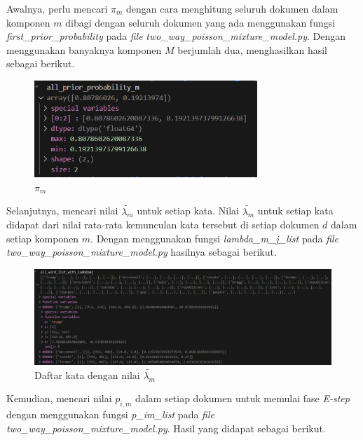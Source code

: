 Awalnya, perlu mencari $\pi_{m}$ dengan cara menghitung seluruh dokumen dalam komponen $m$
dibagi dengan seluruh dokumen yang ada menggunakan fungsi 
\textit{first\_prior\_probability} pada \textit{file} \textit{two\_way\_poisson\_mixture\_model.py}. 
Dengan menggunakan banyaknya komponen $M$ berjumlah dua, menghasilkan hasil sebagai berikut.

\begin{figure}[H]
  \centering
  \includegraphics[width=0.75\textwidth]{gambar/bab_4_image/all_prior_probability_m.jpg}
  \caption{ $\pi_{m}$ }
  \label{gambar:priorProbability}
\end{figure}

Selanjutnya, mencari nilai $\tilde{\lambda_{m}}$ untuk setiap kata. Nilai $\tilde{\lambda_{m}}$
untuk setiap kata didapat dari nilai rata-rata kemunculan kata tersebut di setiap dokumen $d$
dalam setiap komponen $m$. Dengan menggunakan fungsi \textit{lambda\_m\_j\_list} pada \textit{file}
\textit{two\_way\_poisson\_mixture\_model.py} hasilnya sebagai berikut.

\begin{figure}[H]
  \centering
  \includegraphics[width=1\textwidth]{gambar/bab_4_image/all word list lamda mj.jpg}
  \caption{ Daftar kata dengan nilai $\tilde{\lambda_{m}}$}
  \label{gambar:wordListLambdaMJ}
\end{figure}

Kemudian, mencari nilai $p_{i,m}$ dalam setiap dokumen untuk memulai fase \textit{E-step}  
dengan menggunakan fungsi \textit{p\_im\_list} pada \textit{file}
\textit{two\_way\_poisson\_mixture\_model.py}. Hasil yang didapat sebagai berikut.

